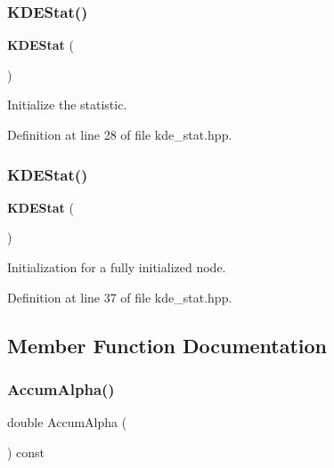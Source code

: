 \subsubsection{K\+D\+E\+Stat()\hspace{0.1cm}{\footnotesize\ttfamily [1/2]}}
{\footnotesize\ttfamily \textbf{ K\+D\+E\+Stat} (\begin{DoxyParamCaption}{ }\end{DoxyParamCaption})\hspace{0.3cm}{\ttfamily [inline]}}



Initialize the statistic. 



Definition at line 28 of file kde\+\_\+stat.\+hpp.

\mbox{\label{classmlpack_1_1kde_1_1KDEStat_a3aeb7df5d75c45ff9510a2088e9a21b5}} 
\subsubsection{K\+D\+E\+Stat()\hspace{0.1cm}{\footnotesize\ttfamily [2/2]}}
{\footnotesize\ttfamily \textbf{ K\+D\+E\+Stat} (\begin{DoxyParamCaption}\item[{Tree\+Type \&}]{ }\end{DoxyParamCaption})\hspace{0.3cm}{\ttfamily [inline]}}



Initialization for a fully initialized node. 



Definition at line 37 of file kde\+\_\+stat.\+hpp.



\subsection{Member Function Documentation}
\mbox{\label{classmlpack_1_1kde_1_1KDEStat_a172b2e6cd43b627158e558e3dacd2c13}} 
\subsubsection{Accum\+Alpha()\hspace{0.1cm}{\footnotesize\ttfamily [1/2]}}
{\footnotesize\ttfamily double Accum\+Alpha (\begin{DoxyParamCaption}{ }\end{DoxyParamCaption}) const\hspace{0.3cm}{\ttfamily [inline]}}



